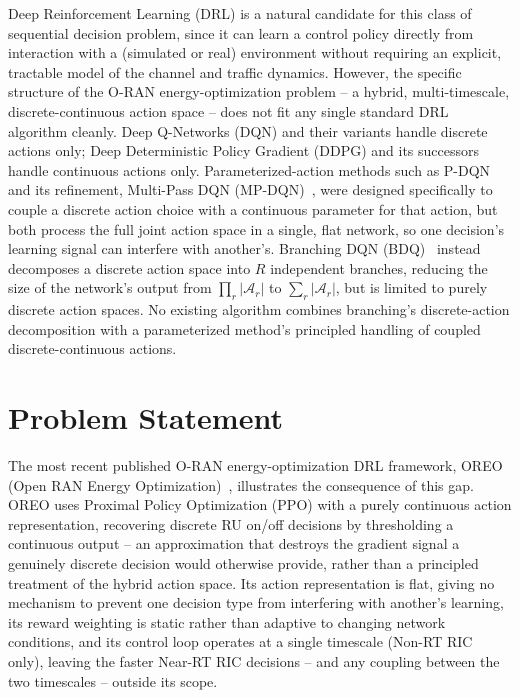 Deep Reinforcement Learning (DRL) is a natural candidate for this class of
sequential decision problem, since it can learn a control policy directly
from interaction with a (simulated or real) environment without requiring an
explicit, tractable model of the channel and traffic dynamics. However, the
specific structure of the O-RAN energy-optimization problem -- a hybrid,
multi-timescale, discrete-continuous action space -- does not fit any single
standard DRL algorithm cleanly. Deep Q-Networks (DQN) and their variants
handle discrete actions only; Deep Deterministic Policy Gradient (DDPG) and
its successors handle continuous actions only. Parameterized-action methods
such as P-DQN~\cite{xiong2018pdqn} and its refinement, Multi-Pass DQN
(MP-DQN)~\cite{bester2019mpdqn}, were designed specifically to couple a
discrete action choice with a continuous parameter for that action, but both
process the full joint action space in a single, flat network, so one
decision's learning signal can interfere with another's. Branching DQN
(BDQ)~\cite{tavakoli2018branching} instead decomposes a discrete action
space into $R$ independent branches, reducing the size of the network's
output from $\prod_r |\mathcal{A}_r|$ to $\sum_r |\mathcal{A}_r|$, but is
limited to purely discrete action spaces. No existing algorithm combines
branching's discrete-action decomposition with a parameterized method's
principled handling of coupled discrete-continuous actions.

\section{Problem Statement}
\label{sec:oran-problem-statement}

The most recent published O-RAN energy-optimization DRL framework, OREO
(Open RAN Energy Optimization)~\cite{qazzaz2026oreo}, illustrates the
consequence of this gap. OREO uses Proximal Policy Optimization (PPO) with a
purely continuous action representation, recovering discrete RU on/off
decisions by thresholding a continuous output -- an approximation that
destroys the gradient signal a genuinely discrete decision would otherwise
provide, rather than a principled treatment of the hybrid action space. Its
action representation is flat, giving no mechanism to prevent one decision
type from interfering with another's learning, its reward weighting is
static rather than adaptive to changing network conditions, and its control
loop operates at a single timescale (Non-RT RIC only), leaving the faster
Near-RT RIC decisions -- and any coupling between the two timescales --
outside its scope.

